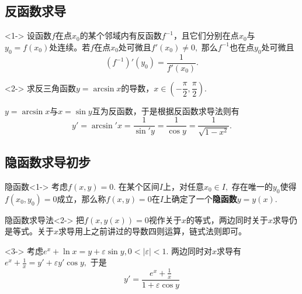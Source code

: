 
\subsection{反函数求导}


\begin{frame}

\begin{thm}<1->
设函数$f$在点$x_0$的某个邻域内有反函数$f^{-1}$，且它们分别在点$x_0$与$y_0=f(x_0)$处连续。若$f$在点$x_0$处可微且$f'(x_0) \neq 0,$ 那么$f^{-1}$也在点$y_0$处可微且
$$(f^{-1})'(y_0) = \dfrac{1}{f'(x_0)}.$$
\end{thm}

\begin{eg}<2->
\centering
求反三角函数$y = \arcsin x$的导数，$x\in(-\dfrac{\pi}{2}, \dfrac{\pi}{2}).$
\end{eg}

\pause

$y = \arcsin x$与$x = \sin y$互为反函数，于是根据反函数求导法则有
$$y' =  \arcsin' x = \dfrac{1}{\sin' y} = \dfrac{1}{\cos y} = \dfrac{1}{\sqrt{1-x^2}}.$$


\end{frame}


\subsection{隐函数求导初步}


\begin{frame}

\begin{block}{隐函数}<1->
考虑$f(x,y) = 0.$ 在某个区间$I$上，对任意$x_0\in I,$ 存在唯一的$y_0$使得$f(x_0,y_0) = 0$成立，那么称$f(x,y) = 0$在$I$上确定了一个{\bfseries 隐函数}$y = y(x).$
\end{block}

\begin{block}{隐函数求导法}<2->
把$f(x,y(x)) = 0$视作关于$x$的等式，两边同时关于$x$求导仍是等式。关于$x$求导用上之前讲过的导数四则运算，链式法则即可。
\end{block}

\begin{eg}<3->
考虑$e^x + \ln x = y + \varepsilon \sin y, 0 < |\varepsilon| < 1.$ 两边同时对$x$求导有$e^x + \frac{1}{x} = y' + \varepsilon y'\cos y,$ 于是
$$y' = \dfrac{e^x + \frac{1}{x}}{1+\varepsilon\cos y}$$
\end{eg}

\end{frame}


